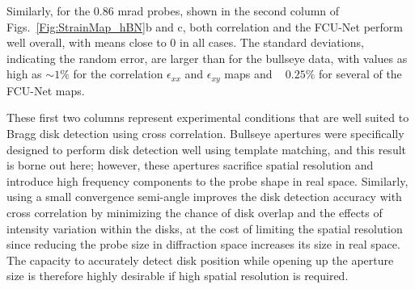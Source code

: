 \documentclass[%
 reprint,
superscriptaddress,
 amsmath,
 amssymb,
 prl,
]{revtex4-2}
\begin{document}
Similarly, for the 0.86 mrad probes, shown in the second column of Figs.~\ref{Fig:StrainMap_hBN}b and c, both correlation and the FCU-Net perform well overall, with means close to 0 in all cases.  The standard deviations, indicating the random error, are larger than for the bullseye data, with values as high as $\sim 1\%$ for the correlation $\epsilon_{xx}$ and $\epsilon_{xy}$ maps and ~ $0.25\%$ for several of the FCU-Net maps.

These first two columns represent experimental conditions that are well suited to Bragg disk detection using cross correlation. Bullseye apertures were specifically designed to perform disk detection well using template matching, and this result is borne out here; however, these apertures sacrifice spatial resolution and introduce high frequency components to the probe shape in real space. Similarly, using a small convergence semi-angle improves the disk detection accuracy with cross correlation by minimizing the chance of disk overlap and the effects of intensity variation within the disks, at the cost of limiting the spatial resolution since reducing the probe size in diffraction space increases its size in real space. The capacity to accurately detect disk position while opening up the aperture size is therefore highly desirable if high spatial resolution is required.



\end{document}
